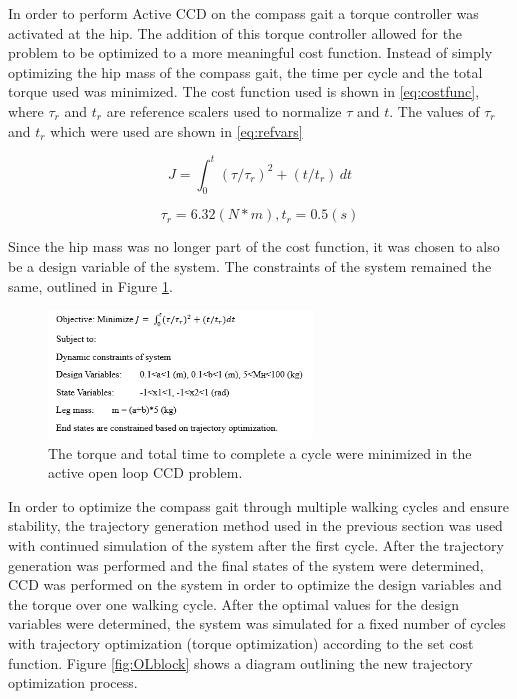 \documentclass[smallextended]{./springer/svjour3}
\begin{document}
In order to perform Active CCD on the compass gait a torque controller was activated at the hip. The addition of this torque controller allowed
for the problem to be optimized to a more meaningful cost function. Instead of simply optimizing the hip mass of the compass gait, the time per cycle 
and the total torque used was minimized. The cost function used is shown in \ref{eq:costfunc}, where $\tau_r$ and $t_r$ are reference scalers used 
to normalize $\tau$ and $t$. The values of $\tau_r$ and $t_r$ which were used are shown in \ref{eq:refvars}

\begin{equation}
\label{eq:costfunc}
J = 
\int_{0}^{t} (\tau / \tau_r)^2 + (t/t_r) \,dt 
\end{equation}

\begin{equation}
\label{eq:refvars}
\tau_r = 6.32 (N*m), 
t_r = 0.5 (s)
\end{equation}

Since the hip mass was no longer part of the cost function, it was chosen to also 
be a design variable of the system. The constraints of the system remained the same, outlined in Figure \ref{fig:OLprob}.

\begin{figure}[h]
\centering
\includegraphics[width=7cm]{./figures/openloopcontrol.png}
\caption{The torque and total time to complete a cycle were minimized in the active open loop CCD problem.}
\label{fig:OLprob}
\end{figure}

In order to optimize the compass gait through multiple walking cycles and ensure stability, the trajectory generation method used
in the previous section was used with continued simulation of the system after the first cycle.
After the trajectory generation was performed and the final states of the system were determined, CCD was performed on the system in order to
optimize the design variables and the torque over one walking cycle. After the optimal values for the design variables were determined, the system was 
simulated for a fixed number of cycles with trajectory optimization (torque optimization) according to the set cost function. Figure \ref{fig:OLblock}
shows a diagram outlining the new trajectory optimization process.
\end{document}
